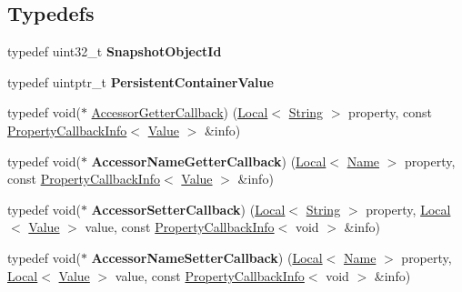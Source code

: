 \subsection*{Typedefs}
\begin{DoxyCompactItemize}
\item 
\hypertarget{namespacev8_acc05be0fdcf26b26fbb410e75a048e63}{}typedef uint32\+\_\+t {\bfseries Snapshot\+Object\+Id}\label{namespacev8_acc05be0fdcf26b26fbb410e75a048e63}

\item 
\hypertarget{namespacev8_af40bc0395e06dd22c3bb1328deb94869}{}typedef uintptr\+\_\+t {\bfseries Persistent\+Container\+Value}\label{namespacev8_af40bc0395e06dd22c3bb1328deb94869}

\item 
typedef void($\ast$ \hyperlink{namespacev8_a722613c87061708a4f1aa050d095f868}{Accessor\+Getter\+Callback}) (\hyperlink{classv8_1_1_local}{Local}$<$ \hyperlink{classv8_1_1_string}{String} $>$ property, const \hyperlink{classv8_1_1_property_callback_info}{Property\+Callback\+Info}$<$ \hyperlink{classv8_1_1_value}{Value} $>$ \&info)
\item 
\hypertarget{namespacev8_a933dad4c36666875af1843bb98df8379}{}typedef void($\ast$ {\bfseries Accessor\+Name\+Getter\+Callback}) (\hyperlink{classv8_1_1_local}{Local}$<$ \hyperlink{classv8_1_1_name}{Name} $>$ property, const \hyperlink{classv8_1_1_property_callback_info}{Property\+Callback\+Info}$<$ \hyperlink{classv8_1_1_value}{Value} $>$ \&info)\label{namespacev8_a933dad4c36666875af1843bb98df8379}

\item 
\hypertarget{namespacev8_a926da9728efe528d193a6d36f004777e}{}typedef void($\ast$ {\bfseries Accessor\+Setter\+Callback}) (\hyperlink{classv8_1_1_local}{Local}$<$ \hyperlink{classv8_1_1_string}{String} $>$ property, \hyperlink{classv8_1_1_local}{Local}$<$ \hyperlink{classv8_1_1_value}{Value} $>$ value, const \hyperlink{classv8_1_1_property_callback_info}{Property\+Callback\+Info}$<$ void $>$ \&info)\label{namespacev8_a926da9728efe528d193a6d36f004777e}

\item 
\hypertarget{namespacev8_a476b359c9fc5ad874bcc2a1a21075556}{}typedef void($\ast$ {\bfseries Accessor\+Name\+Setter\+Callback}) (\hyperlink{classv8_1_1_local}{Local}$<$ \hyperlink{classv8_1_1_name}{Name} $>$ property, \hyperlink{classv8_1_1_local}{Local}$<$ \hyperlink{classv8_1_1_value}{Value} $>$ value, const \hyperlink{classv8_1_1_property_callback_info}{Property\+Callback\+Info}$<$ void $>$ \&info)\label{namespacev8_a476b359c9fc5ad874bcc2a1a21075556}


\end{DoxyCompactItemize}
